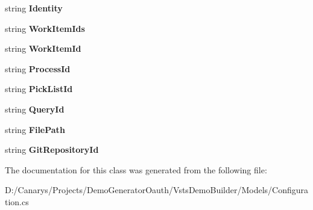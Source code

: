 \begin{DoxyCompactItemize}
string {\bfseries Identity}
\item 
\mbox{\label{class_vsts_demo_builder_1_1_models_1_1_configuration_a0cd19d96a6ba887c62e98a68c32e5279}} 
string {\bfseries Work\+Item\+Ids}
\item 
\mbox{\label{class_vsts_demo_builder_1_1_models_1_1_configuration_a872d730a9d11bbb980a2ec44839560af}} 
string {\bfseries Work\+Item\+Id}
\item 
\mbox{\label{class_vsts_demo_builder_1_1_models_1_1_configuration_a094f39daafad11ca981773b26173324a}} 
string {\bfseries Process\+Id}
\item 
\mbox{\label{class_vsts_demo_builder_1_1_models_1_1_configuration_a1c7379beb181f56174ed59e08a07c323}} 
string {\bfseries Pick\+List\+Id}
\item 
\mbox{\label{class_vsts_demo_builder_1_1_models_1_1_configuration_abe1c0d9c7249cad2b5f716406edeb80f}} 
string {\bfseries Query\+Id}
\item 
\mbox{\label{class_vsts_demo_builder_1_1_models_1_1_configuration_a6703afd0b93a6173a209e13cc3bf12b5}} 
string {\bfseries File\+Path}
\item 
\mbox{\label{class_vsts_demo_builder_1_1_models_1_1_configuration_a26d98dc92342fe5304a1bbbedc1fc9e6}} 
string {\bfseries Git\+Repository\+Id}
\end{DoxyCompactItemize}


The documentation for this class was generated from the following file\+:\begin{DoxyCompactItemize}
\item 
D\+:/\+Canarys/\+Projects/\+Demo\+Generator\+Oauth/\+Vsts\+Demo\+Builder/\+Models/Configuration.\+cs\end{DoxyCompactItemize}
